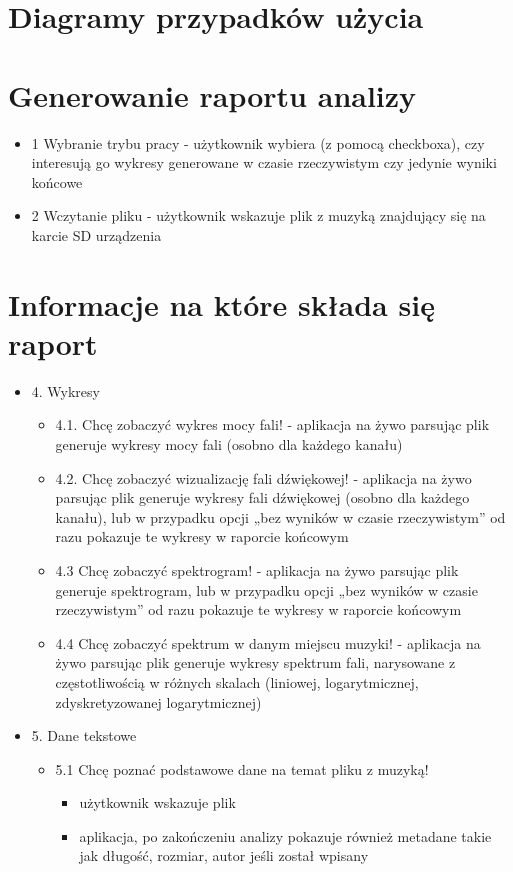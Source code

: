\section{Diagramy przypadków użycia}
\section{Generowanie raportu analizy}
\begin{itemize}
	\item 1 Wybranie trybu pracy - użytkownik wybiera (z pomocą checkboxa), czy interesują go wykresy generowane w 	czasie rzeczywistym czy jedynie wyniki końcowe
	\item 2 Wczytanie pliku - użytkownik wskazuje plik z muzyką znajdujący się na karcie SD urządzenia
\end{itemize}
\section{Informacje na które składa się raport}
\begin{itemize}
	\item   4. Wykresy
	\begin{itemize}
		\item 4.1. Chcę zobaczyć wykres mocy fali!
		- aplikacja na żywo parsując plik generuje wykresy mocy fali (osobno dla każdego kanału)
		\item 4.2. Chcę zobaczyć wizualizację fali dźwiękowej!
		- aplikacja na żywo parsując plik generuje wykresy fali dźwiękowej (osobno dla każdego kanału), lub w przypadku opcji „bez wyników w czasie rzeczywistym” od razu pokazuje te wykresy w raporcie końcowym
		\item 4.3 Chcę zobaczyć spektrogram!
		- aplikacja na żywo parsując plik generuje spektrogram, lub w przypadku opcji „bez wyników w czasie rzeczywistym” od razu pokazuje te wykresy w raporcie końcowym

		\item 4.4 Chcę zobaczyć spektrum w danym miejscu muzyki!
		- aplikacja na żywo parsując plik generuje wykresy spektrum fali, narysowane z częstotliwością w różnych skalach (liniowej, logarytmicznej, zdyskretyzowanej logarytmicznej)
	\end{itemize}
	\item	5. Dane tekstowe
	\begin{itemize}
		\item 5.1 Chcę poznać podstawowe dane na temat pliku z muzyką!
		\begin{itemize}
			\item użytkownik wskazuje plik
			\item aplikacja, po zakończeniu analizy pokazuje również metadane takie jak długość, rozmiar, autor jeśli został wpisany
		\end{itemize}
	\end{itemize}
\end{itemize}

